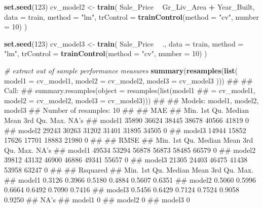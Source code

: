 \documentclass[]{book}
\newenvironment{Shaded}{\begin{snugshade}}{\end{snugshade}}
\newcommand{\CommentTok}[1]{\textcolor[rgb]{0.56,0.35,0.01}{\textit{#1}}}
\newcommand{\DataTypeTok}[1]{\textcolor[rgb]{0.13,0.29,0.53}{#1}}
\newcommand{\DecValTok}[1]{\textcolor[rgb]{0.00,0.00,0.81}{#1}}
\newcommand{\KeywordTok}[1]{\textcolor[rgb]{0.13,0.29,0.53}{\textbf{#1}}}
\newcommand{\NormalTok}[1]{#1}
\newcommand{\OperatorTok}[1]{\textcolor[rgb]{0.81,0.36,0.00}{\textbf{#1}}}
\newcommand{\StringTok}[1]{\textcolor[rgb]{0.31,0.60,0.02}{#1}}
\theoremstyle{definition}
\theoremstyle{definition}
\theoremstyle{definition}
\theoremstyle{remark}
\begin{document}
\begin{Shaded}
\begin{Highlighting}[]
\KeywordTok{set.seed}\NormalTok{(}\DecValTok{123}\NormalTok{)}
\NormalTok{cv_model2 <-}\StringTok{ }\KeywordTok{train}\NormalTok{(}
\NormalTok{  Sale_Price }\OperatorTok{~}\StringTok{ }\NormalTok{Gr_Liv_Area }\OperatorTok{+}\StringTok{ }\NormalTok{Year_Built, }
  \DataTypeTok{data =}\NormalTok{ train, }
  \DataTypeTok{method =} \StringTok{"lm"}\NormalTok{,}
  \DataTypeTok{trControl =} \KeywordTok{trainControl}\NormalTok{(}\DataTypeTok{method =} \StringTok{"cv"}\NormalTok{, }\DataTypeTok{number =} \DecValTok{10}\NormalTok{)}
\NormalTok{  )}

\KeywordTok{set.seed}\NormalTok{(}\DecValTok{123}\NormalTok{)}
\NormalTok{cv_model3 <-}\StringTok{ }\KeywordTok{train}\NormalTok{(}
\NormalTok{  Sale_Price }\OperatorTok{~}\StringTok{ }\NormalTok{., }
  \DataTypeTok{data =}\NormalTok{ train, }
  \DataTypeTok{method =} \StringTok{"lm"}\NormalTok{,}
  \DataTypeTok{trControl =} \KeywordTok{trainControl}\NormalTok{(}\DataTypeTok{method =} \StringTok{"cv"}\NormalTok{, }\DataTypeTok{number =} \DecValTok{10}\NormalTok{)}
\NormalTok{  )}

\CommentTok{# extract out of sample performance measures}
\KeywordTok{summary}\NormalTok{(}\KeywordTok{resamples}\NormalTok{(}\KeywordTok{list}\NormalTok{(}
  \DataTypeTok{model1 =}\NormalTok{ cv_model1, }
  \DataTypeTok{model2 =}\NormalTok{ cv_model2, }
  \DataTypeTok{model3 =}\NormalTok{ cv_model3}
\NormalTok{  )))}
\NormalTok{## }
\NormalTok{## Call:}
\NormalTok{## summary.resamples(object = resamples(list(model1}
\NormalTok{##  = cv_model1, model2 = cv_model2, model3 = cv_model3)))}
\NormalTok{## }
\NormalTok{## Models: model1, model2, model3 }
\NormalTok{## Number of resamples: 10 }
\NormalTok{## }
\NormalTok{## MAE }
\NormalTok{##         Min. 1st Qu. Median  Mean 3rd Qu.  Max. NA's}
\NormalTok{## model1 35890   36624  38445 38678   40566 41819    0}
\NormalTok{## model2 29243   30263  31202 31401   31895 34505    0}
\NormalTok{## model3 14944   15852  17626 17701   18883 21980    0}
\NormalTok{## }
\NormalTok{## RMSE }
\NormalTok{##         Min. 1st Qu. Median  Mean 3rd Qu.  Max. NA's}
\NormalTok{## model1 49534   53294  56878 56873   58485 66579    0}
\NormalTok{## model2 39812   43132  46900 46886   49341 55657    0}
\NormalTok{## model3 21305   24403  46475 41438   53958 63247    0}
\NormalTok{## }
\NormalTok{## Rsquared }
\NormalTok{##          Min. 1st Qu. Median   Mean 3rd Qu.   Max.}
\NormalTok{## model1 0.3126  0.3966 0.5180 0.4884  0.5607 0.6351}
\NormalTok{## model2 0.5060  0.5996 0.6664 0.6492  0.7090 0.7416}
\NormalTok{## model3 0.5456  0.6429 0.7124 0.7524  0.9058 0.9250}
\NormalTok{##        NA's}
\NormalTok{## model1    0}
\NormalTok{## model2    0}
\NormalTok{## model3    0}
\end{Highlighting}
\end{Shaded}
\end{document}
